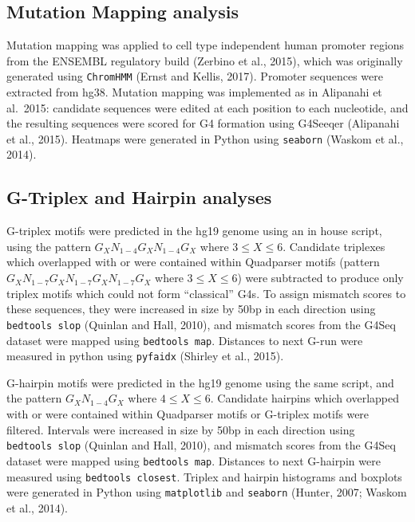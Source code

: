 \documentclass[12pt,a4paper,]{report}
\begin{document}
\hypertarget{mutation-mapping-analysis}{%
\subsection{Mutation Mapping analysis}\label{mutation-mapping-analysis}}

Mutation mapping was applied to cell type independent human promoter
regions from the ENSEMBL regulatory build (Zerbino et al., 2015), which
was originally generated using \texttt{ChromHMM} (Ernst and Kellis,
2017). Promoter sequences were extracted from hg38. Mutation mapping was
implemented as in Alipanahi et al.~2015: candidate sequences were edited
at each position to each nucleotide, and the resulting sequences were
scored for G4 formation using G4Seeqer (Alipanahi et al., 2015).
Heatmaps were generated in Python using \texttt{seaborn} (Waskom et al.,
2014).

\hypertarget{g-triplex-and-hairpin-analyses}{%
\subsection{G-Triplex and Hairpin
analyses}\label{g-triplex-and-hairpin-analyses}}

G-triplex motifs were predicted in the hg19 genome using an in house
script, using the pattern \(G_XN_{1-4}G_XN_{1-4}G_X\) where
\(3 \leqslant X \leqslant 6\). Candidate triplexes which overlapped with
or were contained within Quadparser motifs (pattern
\(G_{X}N_{1-7}G_{X}N_{1-7}G_{X}N_{1-7}G_{X}\) where
\(3 \leqslant X \leqslant 6\)) were subtracted to produce only triplex
motifs which could not form ``classical'' G4s. To assign mismatch scores
to these sequences, they were increased in size by 50bp in each
direction using \texttt{bedtools\ slop} (Quinlan and Hall, 2010), and
mismatch scores from the G4Seq dataset were mapped using
\texttt{bedtools\ map}. Distances to next G-run were measured in python
using \texttt{pyfaidx} (Shirley et al., 2015).

G-hairpin motifs were predicted in the hg19 genome using the same
script, and the pattern \(G_XN_{1-4}G_X\) where
\(4 \leqslant X \leqslant 6\). Candidate hairpins which overlapped with
or were contained within Quadparser motifs or G-triplex motifs were
filtered. Intervals were increased in size by 50bp in each direction
using \texttt{bedtools\ slop} (Quinlan and Hall, 2010), and mismatch
scores from the G4Seq dataset were mapped using \texttt{bedtools\ map}.
Distances to next G-hairpin were measured using
\texttt{bedtools\ closest}. Triplex and hairpin histograms and boxplots
were generated in Python using \texttt{matplotlib} and \texttt{seaborn}
(Hunter, 2007; Waskom et al., 2014).
\end{document}
